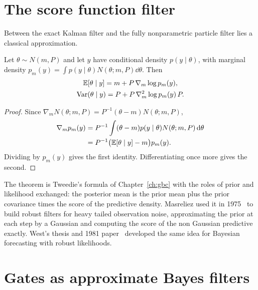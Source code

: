 \section{The score function filter}

Between the exact Kalman filter and the fully nonparametric particle filter lies a classical approximation.

\begin{theorem}
\label{thm:score_update}
Let $\theta\sim N(m,P)$ and let $y$ have conditional density $p(y\mid\theta)$, with marginal density $p_m(y) = \int p(y\mid\theta)N(\theta;m,P)\dd\theta$. Then
\begin{gather*}
\mathbb{E}[\theta\mid y] = m+P\,\nabla_m\log p_m(y), \\
\mathrm{Var}(\theta\mid y) = P+P\,\nabla_m^2\log p_m(y)\,P.
\end{gather*}
\end{theorem}

\begin{proof}
Since $\nabla_mN(\theta;m,P) = P^{-1}(\theta-m)N(\theta;m,P)$,
\[
\begin{aligned}\nabla_mp_m(y) &= P^{-1}\int(\theta-m)p(y\mid\theta)N(\theta;m,P)\,\mathrm{d}\theta\\ &= P^{-1}\big(\mathbb{E}[\theta\mid y]-m\big)p_m(y).\end{aligned}
\]
Dividing by $p_m(y)$ gives the first identity. Differentiating once more gives the second.
\end{proof}

The theorem is Tweedie's formula of Chapter~\ref{ch:gbc} with the roles of prior and likelihood exchanged: the posterior mean is the prior mean plus the prior covariance times the score of the predictive density. Masreliez used it in 1975~\cite{masreliez1975} to build robust filters for heavy tailed observation noise, approximating the prior at each step by a Gaussian and computing the score of the non Gaussian predictive exactly. West's thesis and 1981 paper~\cite{west1981} developed the same idea for Bayesian forecasting with robust likelihoods.



\section{Gates as approximate Bayes filters}
\label{sec:gates_bayes}

